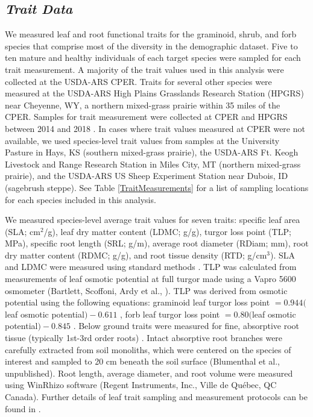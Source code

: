 \documentclass[12pt, letterpaper]{article}
\begin{document}
\subsection{\textit{Trait Data}} We measured leaf and root functional traits for the graminoid, shrub, and forb species that comprise most of the diversity in the demographic dataset. Five to ten mature and healthy individuals of each target species were sampled for each trait measurement. A majority of the trait values used in this analysis were collected at the USDA-ARS CPER. Traits for several other species were measured at the USDA-ARS High Plains Grasslands Research Station (HPGRS) near Cheyenne, WY, a northern mixed-grass prairie within 35 miles of the CPER. Samples for trait measurement were collected at CPER and HPGRS between 2014 and 2018 \cite{Blumenthal2020}. In cases where trait values measured at CPER were not available, we used species-level trait values from samples at the University Pasture in Hays, KS (southern mixed-grass prairie), the USDA-ARS Ft. Keogh Livestock and Range Research Station in Miles City, MT (northern mixed-grass prairie), and the USDA-ARS US Sheep Experiment Station near Dubois, ID (sagebrush steppe). See Table \ref{TraitMeasurements} for a list of sampling locations for each species included in this analysis. 

We measured species-level average trait values for seven traits: specific leaf area (SLA; cm$^2$/g), leaf dry matter content (LDMC; g/g), turgor loss point (TLP; MPa), specific root length (SRL; g/m), average root diameter (RDiam; mm), root dry matter content (RDMC; g/g), and root tissue density (RTD; g/cm$^3$). SLA and LDMC were measured using standard methods \cite{Perez-Harguindeguy2013}. TLP was calculated from measurements of leaf osmotic potential at full turgor made using a Vapro 5600 osmometer (Bartlett, Scoffoni, Ardy et al., ). TLP was derived from osmotic potential using the following equations: graminoid leaf turgor loss point $= 0.944($leaf osmotic potential$)-0.611$ , forb leaf turgor loss point $= 0.80($leaf osmotic potential$)-0.845$ \cite{ Griffin-Nolan2019}. Below ground traits were measured for fine, absorptive root tissue (typically 1st-3rd order roots) \cite{McCormack2015}. Intact absorptive root branches were carefully extracted from soil monoliths, which were centered on the species of interest and sampled to 20 cm beneath the soil surface (Blumenthal et al., unpublished). Root length, average diameter, and root volume were measured using WinRhizo software (Regent Instruments, Inc., Ville de Québec, QC Canada). Further details of leaf trait sampling and measurement protocols can be found in \cite{Blumenthal2020}.
\end{document}
